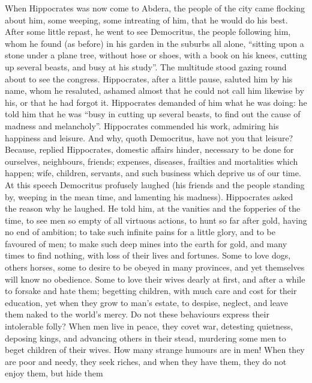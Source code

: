 When Hippocrates was now come to Abdera, the people of the city came flocking
about him, some weeping, some intreating of him, that he would do his best.
After some little repast, he went to see Democritus, the people following him,
whom he found (as before) in his garden in the suburbs all alone,
\enquote{sitting upon a stone under a plane tree, without hose or
shoes, with a book on his knees, cutting up several beasts, and busy at his
study}. The multitude stood gazing round about to see the congress.
Hippocrates, after a little pause, saluted him by his name, whom he resaluted,
ashamed almost that he could not call him likewise by his, or that he had
forgot it. Hippocrates demanded of him what he was doing: he told him that he
was \enquote{busy in cutting up several beasts, to find out the
cause of madness and melancholy}. Hippocrates commended his work, admiring his
happiness and leisure. And why, quoth Democritus, have not you that leisure?
Because, replied Hippocrates, domestic affairs hinder, necessary to be done for
ourselves, neighbours, friends; expenses, diseases, frailties and mortalities
which happen; wife, children, servants, and such business which deprive us of
our time. At this speech Democritus profusely laughed (his friends and the
people standing by, weeping in the mean time, and lamenting his madness).
Hippocrates asked the reason why he laughed. He told him, at the vanities and
the fopperies of the time, to see men so empty of all virtuous actions, to hunt
so far after gold, having no end of ambition; to take such infinite pains for a
little glory, and to be favoured of men; to make such deep mines into the earth
for gold, and many times to find nothing, with loss of their lives and
fortunes. Some to love dogs, others horses, some to desire to be obeyed in many
provinces, and yet themselves will know no obedience.
Some to love their wives dearly at first, and after a while
to forsake and hate them; begetting children, with much care and cost for their
education, yet when they grow to man's estate, to despise,
neglect, and leave them naked to the world's mercy. Do not
these behaviours express their intolerable folly? When men live in peace, they
covet war, detesting quietness, deposing kings, and
advancing others in their stead, murdering some men to beget children of their
wives. How many strange humours are in men! When they are poor and needy, they
seek riches, and when they have them, they do not enjoy them, but hide them
